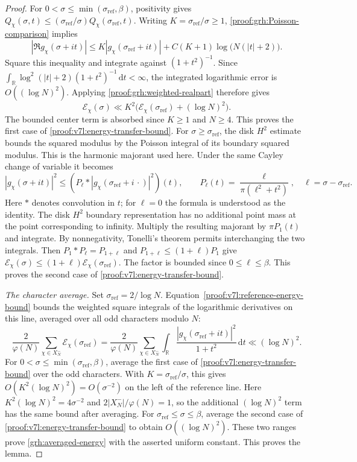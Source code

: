 \documentclass[12pt,a4paper]{amsart}
\numberwithin{equation}{section}
\def\le{\leqslant}
\def\ge{\geqslant}
\theoremstyle{plain}
\theoremstyle{definition}
\theoremstyle{remark}
\begin{document}
\begin{proof}
For $0<\sigma\le\min(\sigma_{\mathrm{ref}},\beta)$, positivity gives
$Q_\chi(\sigma,t)\le(\sigma_{\mathrm{ref}}/\sigma)Q_\chi(\sigma_{\mathrm{ref}},t)$.
Writing $K=\sigma_{\mathrm{ref}}/\sigma\ge1$,
\eqref{proof:grh:Poisson-comparison} implies
\[
 |\Re g_\chi(\sigma+it)|
 \le K|g_\chi(\sigma_{\mathrm{ref}}+it)|
       +C(K+1)\log\bigl(N(|t|+2)\bigr).
\]
Square this inequality and integrate against $(1+t^2)^{-1}$.
Since $\int_{\mathbb R}\log^2(|t|+2)(1+t^2)^{-1}\,\mathrm{d}t<\infty$,
the integrated logarithmic error is $O((\log N)^2)$.
Applying \eqref{proof:grh:weighted-realpart} therefore gives
\[
 \mathscr E_\chi(\sigma)\ll
 K^2\bigl(\mathscr E_\chi(\sigma_{\mathrm{ref}})+(\log N)^2\bigr).
\]
The bounded center term is absorbed since $K\ge1$ and $N\ge4$.
This proves the first case of \eqref{proof:v7l:energy-transfer-bound}.
For $\sigma\ge\sigma_{\mathrm{ref}}$, the disk $H^2$ estimate bounds
the squared modulus by the Poisson integral of its boundary squared
modulus. This is the harmonic majorant used here. Under the same
Cayley change of variable it becomes
\[
 |g_\chi(\sigma+it)|^2
 \le(P_\ell*|g_\chi(\sigma_{\mathrm{ref}}+i\,\cdot)|^2)(t),\qquad
 P_\ell(t)=\frac{\ell}{\pi(\ell^2+t^2)},\quad \ell=\sigma-\sigma_{\mathrm{ref}}.
\]
Here $*$ denotes convolution in $t$; for $\ell=0$ the formula is
understood as the identity. The disk $H^2$ boundary representation
has no additional point mass at the point corresponding to infinity.
Multiply the resulting majorant by $\pi P_1(t)$ and integrate.
By nonnegativity, Tonelli's theorem permits interchanging the two integrals.
Then $P_1*P_\ell=P_{1+\ell}$ and $P_{1+\ell}\le(1+\ell)P_1$ give
$\mathscr E_\chi(\sigma)\le(1+\ell)\mathscr E_\chi(\sigma_{\mathrm{ref}})$.
The factor is bounded since $0\le \ell\le\beta$. This proves the
second case of \eqref{proof:v7l:energy-transfer-bound}.

\emph{The character average.}
Set $\sigma_{\mathrm{ref}}=2/\log N$.
Equation~\eqref{proof:v7l:reference-energy-bound} bounds the weighted
square integrals of the logarithmic derivatives on this line,
averaged over all odd characters modulo $N$:
\[
 \frac2{\varphi(N)}\sum_{\chi\in X_N^-}
       \mathscr E_\chi(\sigma_{\mathrm{ref}})
 =\frac2{\varphi(N)}\sum_{\chi\in X_N^-}
       \int_{\mathbb R}
       \frac{|g_\chi(\sigma_{\mathrm{ref}}+it)|^2}{1+t^2}\,\mathrm{d}t
 \ll(\log N)^2.
\]
For $0<\sigma\le\min(\sigma_{\mathrm{ref}},\beta)$, average the first case of
\eqref{proof:v7l:energy-transfer-bound} over the odd characters.
With $K=\sigma_{\mathrm{ref}}/\sigma$, this gives
$O(K^2(\log N)^2)=O(\sigma^{-2})$ on the left of the reference line.
Here $K^2(\log N)^2=4\sigma^{-2}$ and
$2|X_N^-|/\varphi(N)=1$, so the additional $(\log N)^2$
term has the same bound after averaging.
For $\sigma_{\mathrm{ref}}\le\sigma\le\beta$, average the second case of
\eqref{proof:v7l:energy-transfer-bound} to obtain $O((\log N)^2)$.
These two ranges prove \eqref{grh:averaged-energy} with the
asserted uniform constant.
This proves the lemma.
\end{proof}
\end{document}
